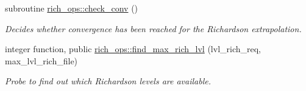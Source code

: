 \begin{DoxyCompactItemize}
subroutine \hyperlink{namespacerich__ops_ac00cce686d45540b238b3b6e39c9bdeb}{rich\+\_\+ops\+::check\+\_\+conv} ()
\begin{DoxyCompactList}\small\item\em Decides whether convergence has been reached for the Richardson extrapolation. \end{DoxyCompactList}\item 
integer function, public \hyperlink{namespacerich__ops_a58e1bed1bed5c2d0b91cc7dc5e3099d9}{rich\+\_\+ops\+::find\+\_\+max\+\_\+rich\+\_\+lvl} (lvl\+\_\+rich\+\_\+req, max\+\_\+lvl\+\_\+rich\+\_\+file)
\begin{DoxyCompactList}\small\item\em Probe to find out which Richardson levels are available. \end{DoxyCompactList}\end{DoxyCompactItemize}
